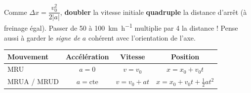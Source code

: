 \documentclass[11pt,a4paper]{article}
\begin{document}
\begin{piege}
Comme $\Delta x=\dfrac{v_0^2}{2|a|}$, \textbf{doubler} la vitesse initiale \textbf{quadruple} la distance
d'arrêt (à freinage égal). Passer de \qty{50}{} à \qty{100}{\kilo\metre\per\hour} multiplie par 4 la distance !
Pense aussi à garder le \emph{signe de $a$} cohérent avec l'orientation de l'axe.
\end{piege}

\begin{remarque}
\begin{center}\small
\begin{tabular}{@{}l|c|c|c@{}}
\toprule
\rowcolor{primary!12}\textbf{Mouvement} & \textbf{Accélération} & \textbf{Vitesse} & \textbf{Position} \\
\midrule
MRU & $a=0$ & $v=v_0$ & $x=x_0+v_0t$ \\
MRUA / MRUD & $a=\text{cte}$ & $v=v_0+at$ & $x=x_0+v_0t+\tfrac12at^2$ \\
\bottomrule
\end{tabular}
\end{center}
\end{remarque}
\end{document}
